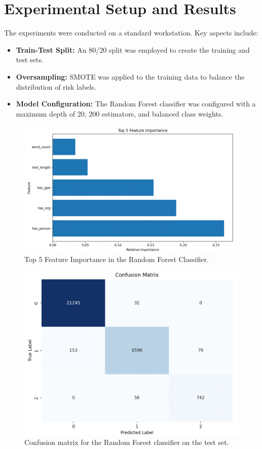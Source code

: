 \documentclass{article}
\begin{document}
\section{Experimental Setup and Results}
The experiments were conducted on a standard workstation. Key aspects include:
\begin{itemize}
    \item \textbf{Train-Test Split:} An 80/20 split was employed to create the training and test sets.
    \item \textbf{Oversampling:} SMOTE was applied to the training data to balance the distribution of risk labels.
    \item \textbf{Model Configuration:} The Random Forest classifier was configured with a maximum depth of 20, 200 estimators, and balanced class weights.
\end{itemize}

\begin{figure}[ht]
    \centering
    \includegraphics[width=0.6\linewidth]{fi.png}
    \caption{Top 5 Feature Importance in the Random Forest Classifier.}
    \label{fig:feature_importance}
\end{figure}

\begin{figure}[ht]
    \centering
    \includegraphics[width=0.6\linewidth]{cm.png}
    \caption{Confusion matrix for the Random Forest classifier on the test set.}
    \label{fig:confusion}
\end{figure}
\end{document}
